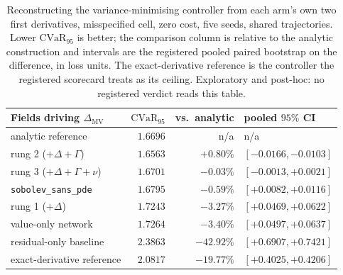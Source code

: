 \documentclass{article}
\begin{document}
\begin{table}[!htbp]
\caption{Reconstructing the variance-minimising controller from each arm's own two
first derivatives, misspecified cell, zero cost, five seeds, shared trajectories.
Lower $\mathrm{CVaR}_{95}$ is better; the comparison column is relative to the
analytic construction and intervals are the registered pooled paired bootstrap on
the difference, in loss units. The exact-derivative reference is the controller the
registered scorecard treats as its ceiling. Exploratory and post-hoc: no registered
verdict reads this table.}
\label{tab:mv}
\centering\footnotesize\setlength{\tabcolsep}{5pt}
\begin{tabular}{@{}lrrl@{}}
\toprule
Fields driving $\Delta_{\mathrm{MV}}$ & $\mathrm{CVaR}_{95}$ & vs.\ analytic & pooled $95\%$ CI \\
\midrule
analytic reference & $1.6696$ & n/a & n/a \\
rung 2 ($+\Delta{+}\Gamma$) & $\mathbf{1.6563}$ & $+0.80\%$ & $[-0.0166, -0.0103]$ \\
rung 3 ($+\Delta{+}\Gamma{+}\nu$) & $1.6701$ & $-0.03\%$ & $[-0.0013, +0.0021]$ \\
\texttt{sobolev\_sans\_pde} & $1.6795$ & $-0.59\%$ & $[+0.0082, +0.0116]$ \\
rung 1 ($+\Delta$) & $1.7243$ & $-3.27\%$ & $[+0.0469, +0.0622]$ \\
value-only network & $1.7264$ & $-3.40\%$ & $[+0.0497, +0.0637]$ \\
residual-only baseline & $2.3863$ & $-42.92\%$ & $[+0.6907, +0.7421]$ \\
\midrule
exact-derivative reference & $2.0817$ & $-19.77\%$ & $[+0.4025, +0.4206]$ \\
\bottomrule
\end{tabular}
\end{table}
\end{document}
